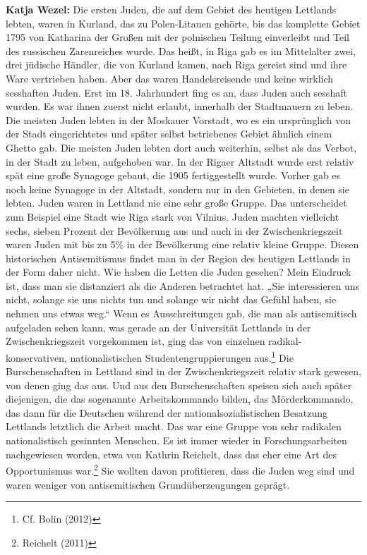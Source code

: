 \textbf{Katja Wezel:} Die ersten Juden, die auf dem Gebiet des heutigen Lettlands lebten, waren in Kurland, das zu Polen-Litauen gehörte, bis das komplette Gebiet 1795 von Katharina der Großen mit der polnischen Teilung einverleibt und Teil des russischen Zarenreiches wurde. Das heißt, in Riga gab es im Mittelalter zwei, drei jüdische Händler, die von Kurland kamen, nach Riga gereist sind und ihre Ware vertrieben haben. Aber das waren Handelsreisende und keine wirklich sesshaften Juden. Erst im 18. Jahrhundert fing es an, dass Juden auch sesshaft wurden. Es war ihnen zuerst nicht erlaubt, innerhalb der Stadtmauern zu leben. Die meisten Juden lebten in der Moskauer Vorstadt, wo es ein ursprünglich von der Stadt eingerichtetes und später selbst betriebenes Gebiet ähnlich einem Ghetto gab. Die meisten Juden lebten dort auch weiterhin, selbst als das Verbot, in der Stadt zu leben, aufgehoben war. In der Rigaer Altstadt wurde erst relativ spät eine große Synagoge gebaut, die 1905 fertiggestellt wurde. Vorher gab es noch keine Synagoge in der Altstadt, sondern nur in den Gebieten, in denen sie lebten. 
Juden waren in Lettland nie eine sehr große Gruppe. Das unterscheidet zum Beispiel eine Stadt wie Riga stark von Vilnius. Juden machten vielleicht sechs, sieben Prozent der Bevölkerung aus und auch in der Zwischenkriegszeit waren Juden mit bis zu 5\% in der Bevölkerung eine relativ kleine Gruppe. Diesen historischen Antisemitismus findet man in der Region des heutigen Lettlands in der Form daher nicht. 
Wie haben die Letten die Juden gesehen? Mein Eindruck ist, dass man sie distanziert als die Anderen betrachtet hat. „Sie interessieren uns nicht, solange sie uns nichts tun und solange wir nicht das Gefühl haben, sie nehmen uns etwas weg.“ Wenn es Ausschreitungen gab, die man als antisemitisch aufgeladen sehen kann, was gerade an der Universität Lettlands in der Zwischenkriegszeit vorgekommen ist, ging das von einzelnen radikal-konservativen, nationalistischen Studentengruppierungen aus.\footnote{Cf. Bolin (2012)} Die Burschenschaften in Lettland sind in der Zwischenkriegszeit relativ stark gewesen, von denen ging das aus. Und aus den Burschenschaften speisen sich auch später diejenigen, die das sogenannte Arbeitskommando bilden, das Mörderkommando, das dann für die Deutschen während der nationalsozialistischen Besatzung Lettlands letztlich die Arbeit macht. Das war eine Gruppe von sehr radikalen nationalistisch gesinnten Menschen. Es ist immer wieder in Forschungsarbeiten nachgewiesen worden, etwa von Kathrin Reichelt, dass das eher eine Art des Opportunismus war.\footnote{Reichelt (2011)} Sie wollten davon profitieren, dass die Juden weg sind und waren weniger von antisemitischen Grundüberzeugungen geprägt. 

